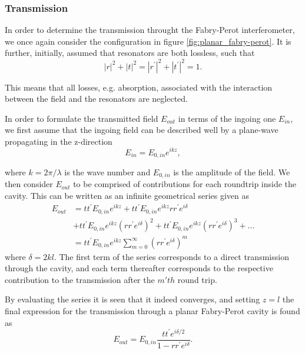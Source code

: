 \subsubsection{Transmission}

In order to determine the transmission throught the Fabry-Perot interferometer, we once again consider the configuration in figure \ref{fig:planar_fabry-perot}. It is further, initially, assumed that resonators are both lossless, such that
\begin{equation}
    |r|^2 + |t|^2 = |r^{\prime}|^2 + |t^{\prime}|^2 = 1.
    \label{eq:lossless_condition}
\end{equation}

This means that all losses, e.g. absorption, associated with the interaction between the field and the resonators are neglected. 

In order to formulate the transmitted field $E_{out}$ in terms of the ingoing one $E_{in}$, we first assume that the ingoing field can be described well by a plane-wave propagating in the z-direction
\begin{equation}
    E_{in} = E_{0,in} e^{ikz},
\end{equation}

where $k = 2 \pi / \lambda$ is the wave number and $E_{0,in}$ is the amplitude of the field. We then consider $E_{out}$ to be comprised of contributions for each roundtrip inside the cavity. This can be written as an infinite geometrical series given as
\begin{equation}
    \begin{split}
        E_{out} & = tt^{\prime} E_{0,in} e^{ikz} + tt^{\prime} E_{0,in} e^{ikz} rr^{\prime} e^{i\delta}\\&+ tt^{\prime} E_{0,in} e^{ikz} \left(rr^{\prime} e^{i\delta}\right)^2 + tt^{\prime} E_{0,in} e^{ikz} \left(rr^{\prime} e^{i\delta}\right)^3 + ...\\& = tt^{\prime} E_{0,in} e^{ikz} \sum^{\infty}_{m=0}\left( rr^{\prime}e^{i\delta} \right)^m
    \end{split}
    \label{eq:transmission_as_geometric_series}
\end{equation}
where $\delta = 2kl$. The first term of the series corresponds to a direct transmission through the cavity, and each term thereafter corresponds to the respective contribution to the transmission after the $m'th$ round trip. 

By evaluating the series it is seen that it indeed converges, and setting $z=l$ the final expression for the transmission through a planar Fabry-Perot cavity is found as
\begin{equation}
    E_{out} = E_{0,in}\frac{tt^{\prime} e^{i\delta /2}}{1 - rr^{\prime} e^{i\delta}}.
    \label{eq:fabry_perot_trans}
\end{equation}

